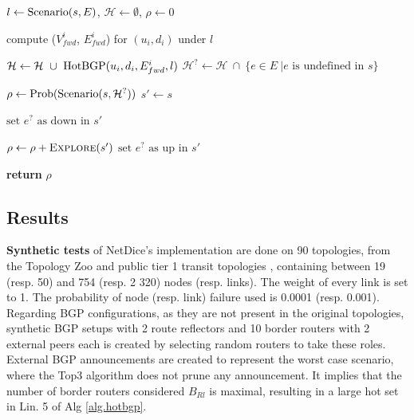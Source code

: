 \begin{algorithm}[t]
  \caption{Computing $P(\phi)$}\label{alg:BGPExplo}
  \begin{algorithmic}[1]
		\State $l \leftarrow \textnormal{Scenario}(s, E)$, $\mathcal{H} \leftarrow \emptyset $, $\rho \leftarrow 0$

	\State compute ($V^i_{fwd}$, $E^i_{fwd}$) for $(u_i, d_i)$ under $l$ 

	\State $\mathcal{H} \leftarrow \mathcal{H} ~ \cup ~ \textnormal{HotBGP}(u_i,d_i, E^i_{fwd}, l)$ 
    \EndFor
		\State $\mathcal{H}^? \leftarrow \mathcal{H} ~ \cap ~ \{ e  \in E ~ | e \text{ is undefined in } s\}$


	\State $\rho \leftarrow  \textnormal{Prob}(\textnormal{Scenario}(s, \mathcal{H}^?))$ 
    \EndIf
    \State $s' \leftarrow s$ 


		\State $\text{set } e^? \text{ as down in } s'$ 

		\State $\rho \leftarrow \rho + \textsc{Explore}(s')$ 
		\State $\text{set } e^? \text{ as up in } s'$ 
    \EndFor

    \State \textbf{return} $\rho$

  \EndProcedure
  \end{algorithmic}

  \label{alg:finalImpl}
\end{algorithm}

\subsection{Results} \label{sec:results}



\textbf{Synthetic tests} of NetDice's implementation are done on 90 topologies, from the Topology Zoo \cite{topologyZoo} and public tier 1 transit topologies \cite{tier1Topo}, containing between 19 (resp. 50) and 754 (resp. 2 320) nodes (resp. links). 
The weight of every link is set to 1.
The probability of node (resp. link) failure used is 0.0001 (resp. 0.001).
Regarding BGP configurations, as they are not present in the original topologies, synthetic BGP setups with 2 route reflectors and 10 border routers with 2 external peers each is created by selecting random routers to take these roles. 
External BGP announcements are created to represent the worst case scenario, where the Top3 algorithm does not prune any announcement.
It implies that the number of border routers considered $B_{Rl}$ is maximal, resulting in a large hot set in Lin. 5 of Alg \ref{alg.hotbgp}. 

